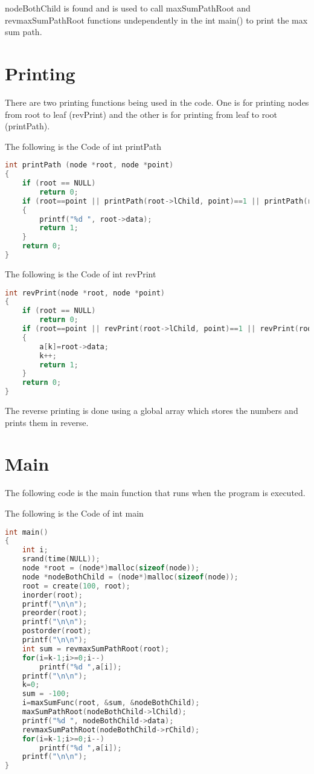\documentclass{article}
\begin{document}
nodeBothChild is found and is used to call maxSumPathRoot and revmaxSumPathRoot functions undependently in the int main() to print the max sum path.

\section{Printing}

There are two printing functions being used in the code. One is for printing nodes from root to leaf (revPrint) and the other is for printing from leaf to root (printPath).

The following is the Code of int printPath
\begin{lstlisting}[language=c, caption=check\_print]
int printPath (node *root, node *point)
{
    if (root == NULL)
        return 0;
    if (root==point || printPath(root->lChild, point)==1 || printPath(root->rChild, point)==1)
    {
        printf("%d ", root->data);
        return 1;
    }
    return 0;
}
\end{lstlisting}

The following is the Code of int revPrint
\begin{lstlisting}[language=c, caption=check\_print]
int revPrint(node *root, node *point)
{
    if (root == NULL)
        return 0;
    if (root==point || revPrint(root->lChild, point)==1 || revPrint(root->rChild, point)==1)
    {
        a[k]=root->data;
        k++;
        return 1;
    }
    return 0;
}
\end{lstlisting}

The reverse printing is done using a global array which stores the numbers and prints them in reverse.

\section{Main}

The following code is the main function that runs when the program is executed.

The following is the Code of int main
\begin{lstlisting}[language=c, caption=main]
int main()
{
    int i;
    srand(time(NULL));
    node *root = (node*)malloc(sizeof(node));
    node *nodeBothChild = (node*)malloc(sizeof(node));
    root = create(100, root);
    inorder(root);
    printf("\n\n");
    preorder(root);
    printf("\n\n");
    postorder(root);
    printf("\n\n");
    int sum = revmaxSumPathRoot(root);
    for(i=k-1;i>=0;i--)
        printf("%d ",a[i]);
    printf("\n\n");
    k=0;
    sum = -100;
    i=maxSumFunc(root, &sum, &nodeBothChild);
    maxSumPathRoot(nodeBothChild->lChild);
    printf("%d ", nodeBothChild->data);
    revmaxSumPathRoot(nodeBothChild->rChild);
    for(i=k-1;i>=0;i--)
        printf("%d ",a[i]);
    printf("\n\n");
}
\end{lstlisting}
\end{document}
